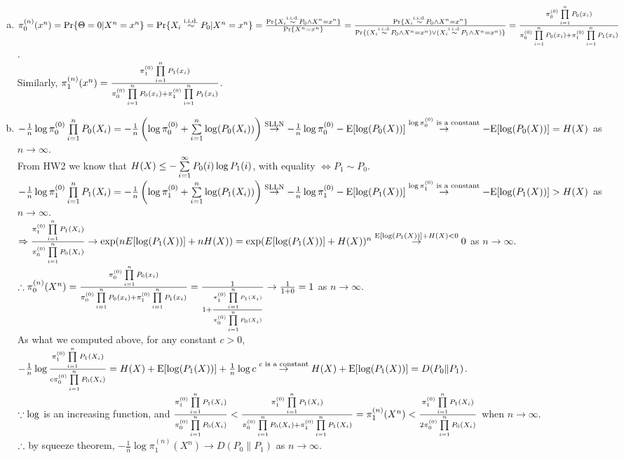 \begin{pr}$ $
\begin{enumerate}[(a)]
\item $\pi_0^{(n)}(x^n)=\mathrm{Pr}\{\Theta=0|X^n=x^n\}=\mathrm{Pr}\{X_i\overset{\text{i.i.d.}}\sim P_0|X^n=x^n\}=\frac{\mathrm{Pr}\{X_i\overset{\text{i.i.d.}}\sim P_0\land X^n=x^n\}}{\mathrm{Pr}\{X^n=x^n\}}=\frac{\mathrm{Pr}\{X_i\overset{\text{i.i.d.}}\sim P_0\land X^n=x^n\}}{\mathrm{Pr}\{(X_i\overset{\text{i.i.d.}}\sim P_0\land X^n=x^n)\lor(X_i\overset{\text{i.i.d.}}\sim P_1\land X^n=x^n)\}}=\frac{\pi_0^{(0)}\prod\limits_{i=1}^nP_0(x_i)}{\pi_0^{(0)}\prod\limits_{i=1}^nP_0(x_i)+\pi_1^{(0)}\prod\limits_{i=1}^nP_1(x_i)}$.\\
Similarly, $\pi_1^{(n)}(x^n)=\frac{\pi_1^{(0)}\prod\limits_{i=1}^nP_1(x_i)}{\pi_0^{(0)}\prod\limits_{i=1}^nP_0(x_i)+\pi_1^{(0)}\prod\limits_{i=1}^nP_1(x_i)}$.
\item $-\frac1n\log\pi_0^{(0)}\prod\limits_{i=1}^nP_0(X_i)=-\frac1n\left(\log\pi_0^{(0)}+\sum\limits_{i=1}^n\log(P_0(X_i))\right)\overset{\text{SLLN}}\to-\frac1n\log\pi_0^{(0)}-\mathrm{E}[\log(P_0(X))]\overset{\log\pi_0^{(0)}\text{ is a constant}}\to-\mathrm{E}[\log(P_0(X))]=H(X)$ as $n\to\infty$.\\
From HW2 we know that $H(X)\leq-\sum\limits_{i=1}^\infty P_0(i)\log P_1(i)$, with equality $\iff P_1\sim P_0$.\\
$-\frac1n\log\pi_1^{(0)}\prod\limits_{i=1}^nP_1(X_i)=-\frac1n\left(\log\pi_1^{(0)}+\sum\limits_{i=1}^n\log(P_1(X_i))\right)\overset{\text{SLLN}}\to-\frac1n\log\pi_1^{(0)}-\mathrm{E}[\log(P_1(X))]\overset{\log\pi_1^{(0)}\text{ is a constant}}\to-\mathrm{E}[\log(P_1(X))]>H(X)$ as $n\to\infty$.\\
$\Rightarrow\frac{\pi_1^{(0)}\prod\limits_{i=1}^nP_1(X_i)}{\pi_0^{(0)}\prod\limits_{i=1}^nP_0(X_i)}\to\exp(nE[\log(P_1(X))]+nH(X))=\exp(E[\log(P_1(X))]+H(X))^n\overset{\mathrm{E}[\log(P_1(X))]+H(X)<0}\to0$ as $n\to\infty$.\\
$\therefore\pi_0^{(n)}(X^n)=\frac{\pi_0^{(0)}\prod\limits_{i=1}^nP_0(x_i)}{\pi_0^{(0)}\prod\limits_{i=1}^nP_0(x_i)+\pi_1^{(0)}\prod\limits_{i=1}^nP_1(x_i)}=\frac1{1+\frac{\pi_1^{(0)}\prod\limits_{i=1}^nP_1(X_i)}{\pi_0^{(0)}\prod\limits_{i=1}^nP_0(X_i)}}\to\frac1{1+0}=1$ as $n\to\infty$.\\
As what we computed above, for any constant $c>0$, $-\frac1n\log\frac{\pi_1^{(0)}\prod\limits_{i=1}^nP_1(X_i)}{c\pi_0^{(0)}\prod\limits_{i=1}^nP_0(X_i)}=H(X)+\mathrm{E}[\log(P_1(X))]+\frac1n\log c\overset{c\text{ is a constant}}\to H(X)+\mathrm{E}[\log(P_1(X))]=D(P_0\|P_1)$.\\
$\because\log$ is an increasing function, and $\frac{\pi_1^{(0)}\prod\limits_{i=1}^nP_1(X_i)}{\pi_0^{(0)}\prod\limits_{i=1}^nP_0(X_i)}<\frac{\pi_1^{(0)}\prod\limits_{i=1}^nP_1(X_i)}{\pi_0^{(0)}\prod\limits_{i=1}^nP_0(X_i)+\pi_1^{(0)}\prod\limits_{i=1}^nP_1(X_i)}=\pi_1^{(n)}(X^n)<\frac{\pi_1^{(0)}\prod\limits_{i=1}^nP_1(X_i)}{2\pi_0^{(0)}\prod\limits_{i=1}^nP_0(X_i)}$ when $n\to\infty$.\\
$\therefore$ by squeeze theorem, $-\frac1n\log\pi_1^{(n)}(X^n)\to D(P_0\|P_1)$ as $n\to\infty$.
\end{enumerate}
\end{pr}
